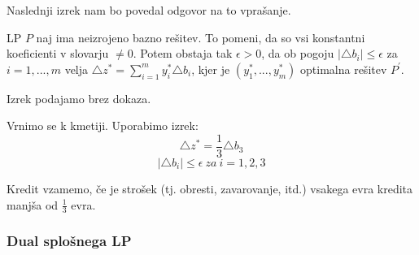 \documentclass[11pt, a4paper]{article}
\begin{document}
    Naslednji izrek nam bo povedal odgovor na to vprašanje.

    \begin{theorem}
        LP \(P\) naj ima neizrojeno bazno rešitev. To pomeni, da so vsi konstantni koeficienti v slovarju \(\neq 0\).
        Potem obstaja tak \(\epsilon > 0\), da ob pogoju \(| \triangle b_i | \le \epsilon\) za \(i=1,...,m\) velja \(\triangle z^* = \sum_{i=1}^{m} y_i^* \triangle b_i\), kjer je \((y_1^*,...,y_m^*)\) optimalna rešitev \(P^\prime\).
    \end{theorem}

    Izrek podajamo brez dokaza.

    \begin{example}
        Vrnimo se k kmetiji. Uporabimo izrek:
        \[
            \triangle z^* = \frac{1}{3} \triangle b_3
        \]
        \[
            | \triangle b_i | \le \epsilon\ za\ i=1,2,3
        \]

        Kredit vzamemo, če je strošek (tj. obresti, zavarovanje, itd.) vsakega evra kredita manjša od \(\frac{1}{3}\) evra. 
    \end{example}

    \subsubsection{Dual splošnega LP}
\end{document}

